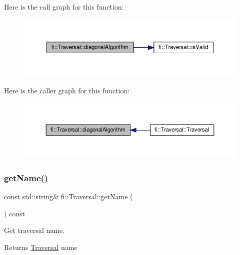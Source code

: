 Here is the call graph for this function\+:
\nopagebreak
\begin{figure}[H]
\begin{center}
\leavevmode
\includegraphics[width=350pt]{d8/d0e/classfi_1_1Traversal_af393d529ec262d13ca83dd98f39c2789_cgraph}
\end{center}
\end{figure}
Here is the caller graph for this function\+:
\nopagebreak
\begin{figure}[H]
\begin{center}
\leavevmode
\includegraphics[width=350pt]{d8/d0e/classfi_1_1Traversal_af393d529ec262d13ca83dd98f39c2789_icgraph}
\end{center}
\end{figure}
\mbox{\label{classfi_1_1Traversal_a691f480264eac83358cba0465faeb0ff}} 
\subsubsection{\texorpdfstring{get\+Name()}{getName()}}
{\footnotesize\ttfamily const std\+::string\& fi\+::\+Traversal\+::get\+Name (\begin{DoxyParamCaption}{ }\end{DoxyParamCaption}) const\hspace{0.3cm}{\ttfamily [inline]}}



Get traversal name. 

\begin{DoxyReturn}{Returns}
\hyperlink{classfi_1_1Traversal}{Traversal} name 
\end{DoxyReturn}


